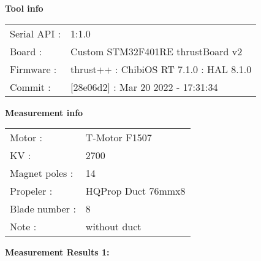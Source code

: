 \documentclass[10pt]{article}
\begin{document}
\noindent
{\large \bf Tool info}
\vspace{3mm}

\noindent
\begin{tabular}{ll}
Serial API : 	&1:1.0  \\
Board	:		&Custom STM32F401RE thrustBoard v2  \\
Firmware :		&thrust++ : ChibiOS RT 7.1.0 : HAL 8.1.0  \\
Commit :		&[28e06d2] : Mar 20 2022 - 17:31:34
\end{tabular}
\vspace{3mm}

\noindent
{\large \bf Measurement info}
\vspace{3mm}

\noindent
\begin{tabular}{ll}
Motor : 		&T-Motor F1507  \\
KV : 			&2700  \\
Magnet poles : 	&14  \\

Propeler : 		&HQProp Duct 76mmx8  \\
Blade number : 	&8  \\
Note :			&without duct
\end{tabular}

\vspace{3mm}

\noindent
{\large \bf Measurement Results 1:}
\vspace{3mm}
\end{document}
